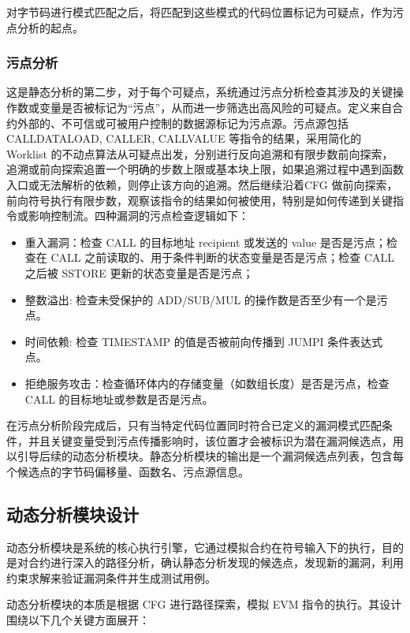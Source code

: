 \documentclass[print, master, vlined, timesmath]{DissertUESTC}
\begin{document}
对字节码进行模式匹配之后，将匹配到这些模式的代码位置标记为可疑点，作为污点分析的起点。  



\subsubsection{污点分析}

这是静态分析的第二步，对于每个可疑点，系统通过污点分析检查其涉及的关键操作数或变量是否被标记为“污点”，从而进一步筛选出高风险的可疑点。定义来自合约外部的、不可信或可被用户控制的数据源标记为污点源。污点源包括 CALLDATALOAD, CALLER, CALLVALUE 等指令的结果，采用简化的 Worklist 的不动点算法从可疑点出发，分别进行反向追溯和有限步数前向探索，追溯或前向探索追置一个明确的步数上限或基本块上限，如果追溯过程中遇到函数入口或无法解析的依赖，则停止该方向的追溯。然后继续沿着CFG 做前向探索，前向符号执行有限步数，观察该指令的结果如何被使用，特别是如何传递到关键指令或影响控制流。四种漏洞的污点检查逻辑如下：

\begin{itemize}
    \item 重入漏洞：检查 CALL 的目标地址 recipient 或发送的 value 是否是污点；检查在 CALL 之前读取的、用于条件判断的状态变量是否是污点；检查 CALL 之后被 SSTORE 更新的状态变量是否是污点；
    \item 整数溢出: 检查未受保护的 ADD/SUB/MUL 的操作数是否至少有一个是污点。
    \item 时间依赖: 检查 TIMESTAMP 的值是否被前向传播到 JUMPI 条件表达式点。
    \item 拒绝服务攻击：检查循环体内的存储变量（如数组长度）是否是污点，检查 CALL 的目标地址或参数是否是污点。
\end{itemize}

在污点分析阶段完成后，只有当特定代码位置同时符合已定义的漏洞模式匹配条件，并且关键变量受到污点传播影响时，该位置才会被标识为潜在漏洞候选点，用以引导后续的动态分析模块。静态分析模块的输出是一个漏洞候选点列表，包含每个候选点的字节码偏移量、函数名、污点源信息。

\subsection{动态分析模块设计}

动态分析模块是系统的核心执行引擎，它通过模拟合约在符号输入下的执行，目的是对合约进行深入的路径分析，确认静态分析发现的候选点，发现新的漏洞，利用约束求解来验证漏洞条件并生成测试用例。

动态分析模块的本质是根据 CFG 进行路径探索，模拟 EVM 指令的执行。其设计围绕以下几个关键方面展开：
\end{document}
